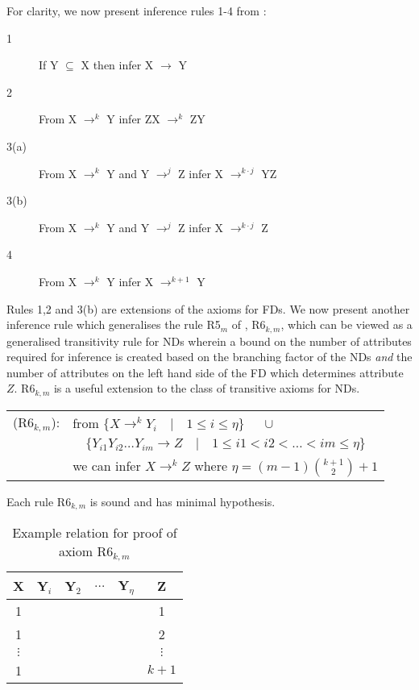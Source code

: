 For clarity, we now present inference rules 1-4 from \cite{gm85a}:
\begin{description}
\item[1] If Y $\subseteq$ X then infer X $\to$ Y
\item[2] From X $\to^k$ Y infer ZX $\to^k$ ZY
\item[3(a)] From X $\to^k$ Y and Y $\to^j$ Z infer X $\to^{k \cdot j}$ YZ
\item[3(b)] From X $\to^k$ Y and Y $\to^j$ Z infer X $\to^{k \cdot j}$ Z
\item[4] From X $\to^k$ Y infer X $\to^{k + 1}$ Y
\end{description}

Rules 1,2 and 3(b) are extensions of the axioms for FDs.
We now present another inference rule which generalises the rule
R5$_m$ of \cite{gm85b}, R6$_{k,m}$, which can be viewed as a generalised
transitivity rule for NDs wherein a bound on the number of attributes
required for inference is created based on the branching factor of the
NDs {\em and} the number of attributes on the left hand side of the FD
which determines attribute $Z$. R6$_{k,m}$ is a useful extension to
the class of transitive axioms for NDs.

\smallskip
{\line
\begin{table}[ht]
\begin{tabular}{cl} \\
(R6$_{k,m}$): 	& from  $\{ X \to^{k} Y_i \quad |  \quad 1 \le i \le
		\eta \}$    $\quad \cup$ \\
		&    $\quad \{ Y_{i1}Y_{i2} \ldots Y_{im} \to Z
		\quad |  \quad 1 \le i1 < i2 < \ldots < im \le \eta \}$ \\ 
\rule{0cm}{5mm} & we can infer $X \to^{k} Z$ where $\eta =
		(m-1){k+1 \choose 2} + 1$  \\
\end{tabular}
\end{table}}
\smallskip

\begin{theorem}\label{th:1}
\begin{rm}
Each rule R6$_{k,m}$ is sound and has minimal hypothesis.
\end{rm}
\end{theorem}

{\line
\begin{table}[ht]
\begin{center}
\begin{tabular}{|c|c|c|c|c|c|} \hline
X	&	Y$_i$	&	Y$_2$	& $\ldots$ & Y$_{\eta}$	 & Z \\\hline
1	&		&		&          &	       & 1 \\
1	&		&		&          &	       & 2 \\	
$\vdots$ &		&		&          &	       & $\vdots$ \\
1	&		&		&          &	       & $k+1$\\ \hline
\end{tabular}
\end{center}
\caption{\label{tbl:axiom_r6km} Example relation for proof of axiom R6$_{k,m}$}
\end{table}}	


